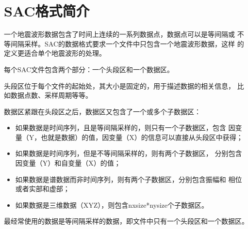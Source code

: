 \section{SAC格式简介}
一个地震波形数据包含了时间上连续的一系列数据点，数据点可以是等间隔或
不等间隔采样。SAC的数据格式要求一个文件中只包含一个地震波形数据，这样
的定义更适合单个地震波形的处理。

每个SAC文件包含两个部分：一个头段区和一个数据区。

头段区位于每个文件的起始处，其大小是固定的，用于描述数据的相关信息，
比如数据点数、采样周期等等。

数据区紧跟在头段区之后，数据区又包含了一个或多个子数据区：
\begin{itemize}
\item 如果数据是时间序列，且是等间隔采样的，则只有一个子数据区，包含
    因变量（Y，也就是数据）的值，因变量（X）的信息可以直接从头段区中获得；
\item 如果数据是时间序列，但是不等间隔采样的，则有两个子数据区，
    分别包含因变量（Y）和自变量（X）的值；
\item 如果数据是谱数据而非时间序列，则有两个子数据区，分别包含振幅和
    相位或者实部和虚部；
\item 如果数据是三维数据（XYZ），则包含nxsize*nysize个子数据区。
\end{itemize}
最经常使用的数据是等间隔采样的数据，即文件中只有一个头段区和一个数据区。
